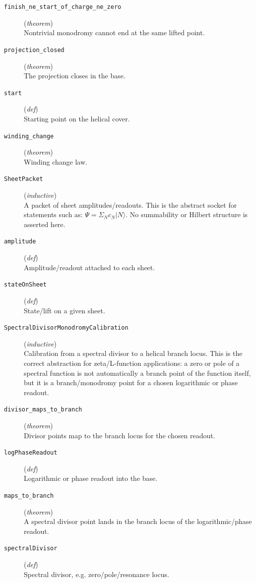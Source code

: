 \documentclass[11pt,a4paper]{article}
\begin{document}
\begin{description}
  \item[\texttt{finish\_ne\_start\_of\_charge\_ne\_zero}] (\textit{theorem}) \\ Nontrivial monodromy cannot end at the same lifted point.
  \item[\texttt{projection\_closed}] (\textit{theorem}) \\ The projection closes in the base.
  \item[\texttt{start}] (\textit{def}) \\ Starting point on the helical cover.
  \item[\texttt{winding\_change}] (\textit{theorem}) \\ Winding change law.
  \item[\texttt{SheetPacket}] (\textit{inductive}) \\ A packet of sheet amplitudes/readouts. 
This is the abstract socket for statements such as: 
$\Psi  = \Sigma _N c_N |N\rangle $. 
No summability or Hilbert structure is asserted here.
  \item[\texttt{amplitude}] (\textit{def}) \\ Amplitude/readout attached to each sheet.
  \item[\texttt{stateOnSheet}] (\textit{def}) \\ State/lift on a given sheet.
  \item[\texttt{SpectralDivisorMonodromyCalibration}] (\textit{inductive}) \\ Calibration from a spectral divisor to a helical branch locus. 
This is the correct abstraction for zeta/L-function applications: 
a zero or pole of a spectral function is not automatically a branch point of 
the function itself, but it is a branch/monodromy point for a chosen logarithmic 
or phase readout.
  \item[\texttt{divisor\_maps\_to\_branch}] (\textit{theorem}) \\ Divisor points map to the branch locus for the chosen readout.
  \item[\texttt{logPhaseReadout}] (\textit{def}) \\ Logarithmic or phase readout into the base.
  \item[\texttt{maps\_to\_branch}] (\textit{theorem}) \\ A spectral divisor point lands in the branch locus of the logarithmic/phase 
readout.
  \item[\texttt{spectralDivisor}] (\textit{def}) \\ Spectral divisor, e.g. zero/pole/resonance locus.

\end{description}
\end{document}
